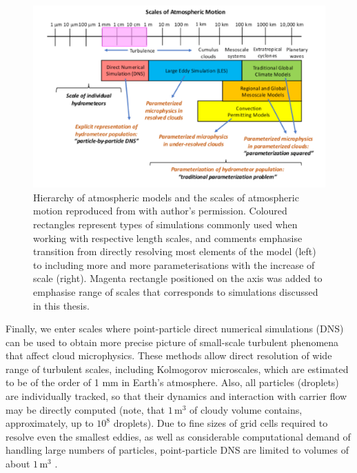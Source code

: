 \documentclass{pracamgren}
\begin{document}
\begin{figure}[ht]
\centering
\includegraphics[width=13cm]{figures/0-01_atmo-scales.png}
\caption{
Hierarchy of atmospheric models and the scales of atmospheric motion reproduced from \textcite{Morrison2020} with author's permission.
Coloured rectangles represent types of simulations commonly used when working with respective length scales, and comments emphasise transition from directly resolving most elements of the model (left) to including more and more parameterisations with the increase of scale (right).
Magenta rectangle positioned on the axis was added to emphasise range of scales that corresponds to simulations discussed in this thesis.
}
\label{fig:atmo-scales}
\end{figure}

Finally, we enter scales where point-particle direct numerical simulations (DNS) can be used to obtain more precise picture of small-scale turbulent phenomena that affect cloud microphysics.
These methods allow direct resolution of wide range of turbulent scales, including Kolmogorov microscales, which are estimated to be of the order of 1 mm in Earth's atmosphere.
Also, all particles (droplets) are individually tracked, so that their dynamics and interaction with carrier flow may be directly computed (note, that $1 \, \text{m}^{3}$ of cloudy volume contains, approximately, up to $10^{8}$ droplets).
Due to fine sizes of grid cells required to resolve even the smallest eddies, as well as considerable computational demand of handling large numbers of particles, point-particle DNS are limited to volumes of about $1 \, \text{m}^{3}$ \parencite{Morrison2020}.
\end{document}

